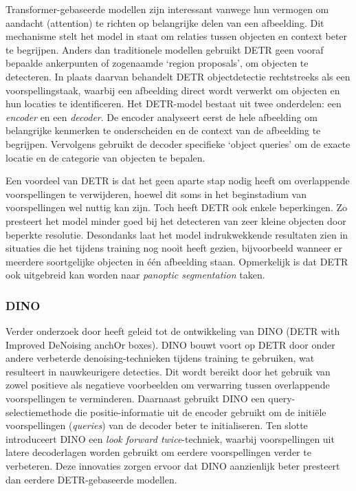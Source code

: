 Transformer-gebaseerde modellen zijn interessant vanwege hun vermogen om aandacht (attention) te richten op belangrijke delen van een afbeelding. 
Dit mechanisme stelt het model in staat om relaties tussen objecten en context beter te begrijpen.
Anders dan traditionele modellen gebruikt DETR geen vooraf bepaalde ankerpunten of zogenaamde `region proposals', om objecten te detecteren. 
In plaats daarvan behandelt DETR objectdetectie rechtstreeks als een voorspellingstaak, waarbij een afbeelding direct wordt verwerkt om objecten en hun locaties te identificeren.
Het DETR-model bestaat uit twee onderdelen: een \textit{encoder} en een \textit{decoder}. De encoder analyseert eerst de hele afbeelding om belangrijke kenmerken te onderscheiden en de context van de afbeelding te begrijpen. 
Vervolgens gebruikt de decoder specifieke `object queries' om de exacte locatie en de categorie van objecten te bepalen.

Een voordeel van DETR is dat het geen aparte stap nodig heeft om overlappende voorspellingen te verwijderen, hoewel dit soms in het beginstadium van voorspellingen wel nuttig kan zijn.
Toch heeft DETR ook enkele beperkingen. Zo presteert het model minder goed bij het detecteren van zeer kleine objecten door beperkte resolutie. 
Desondanks laat het model indrukwekkende resultaten zien in situaties die het tijdens training nog nooit heeft gezien, bijvoorbeeld wanneer er meerdere soortgelijke objecten in één afbeelding staan.
Opmerkelijk is dat DETR ook uitgebreid kan worden naar \textit{panoptic segmentation} taken.

\subsubsection{DINO}

Verder onderzoek door \textcite{Zhang2022} heeft geleid tot de ontwikkeling van DINO (DETR with Improved DeNoising anchOr boxes). 
DINO bouwt voort op DETR door onder andere verbeterde denoising-technieken tijdens training te gebruiken, wat resulteert in nauwkeurigere detecties. 
Dit wordt bereikt door het gebruik van zowel positieve als negatieve voorbeelden om verwarring tussen overlappende voorspellingen te verminderen. 
Daarnaast gebruikt DINO een query-selectiemethode die positie-informatie uit de encoder gebruikt om de initiële voorspellingen (\textit{queries}) van de decoder beter te initialiseren. 
Ten slotte introduceert DINO een \textit{look forward twice}-techniek, waarbij voorspellingen uit latere decoderlagen worden gebruikt om eerdere voorspellingen verder te verbeteren. 
Deze innovaties zorgen ervoor dat DINO aanzienlijk beter presteert dan eerdere DETR-gebaseerde modellen.

